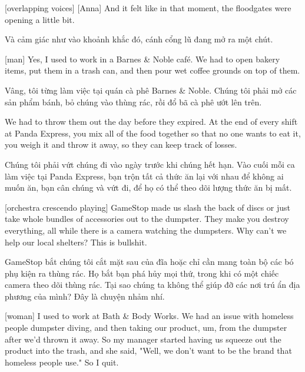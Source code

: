 \documentclass[a4paper]{article}
\begin{document}
	[overlapping voices]
	[Anna] And it felt like in that moment, the floodgates were opening a little bit.
	
	\begin{vietnamese-v2}
		 Và cảm giác như vào khoảnh khắc đó, cánh cổng lũ đang mở ra một chút.
	\end{vietnamese-v2}
	
	[man] Yes, I used to work in a Barnes \& Noble café.
	We had to open bakery items, put them in a trash can, and then pour wet coffee grounds on top of them.
	
	\begin{vietnamese-v2}
		 Vâng, tôi từng làm việc tại quán cà phê Barnes \& Noble.
		Chúng tôi phải mở các sản phẩm bánh, bỏ chúng vào thùng rác, rồi đổ bã cà phê ướt lên trên.
	\end{vietnamese-v2}
	
	We had to throw them out the day before they expired.
	At the end of every shift at Panda Express, you mix all of the food together so that no one wants to eat it, you weigh it and throw it away, so they can keep track of losses.
	
	\begin{vietnamese-v2}
		Chúng tôi phải vứt chúng đi vào ngày trước khi chúng hết hạn.
		Vào cuối mỗi ca làm việc tại Panda Express, bạn trộn tất cả thức ăn lại với nhau để không ai muốn ăn, bạn cân chúng và vứt đi, để họ có thể theo dõi lượng thức ăn bị mất.
	\end{vietnamese-v2}
	
	[orchestra crescendo playing]
	GameStop made us slash the back of discs or just take whole bundles of accessories out to the dumpster.
	They make you destroy everything, all while there is a camera watching the dumpsters.
	Why can't we help our local shelters? This is bullshit.
	
	\begin{vietnamese-v2}
		GameStop bắt chúng tôi cắt mặt sau của đĩa hoặc chỉ cần mang toàn bộ các bó phụ kiện ra thùng rác.
		Họ bắt bạn phá hủy mọi thứ, trong khi có một chiếc camera theo dõi thùng rác.
		Tại sao chúng ta không thể giúp đỡ các nơi trú ẩn địa phương của mình? Đây là chuyện nhảm nhí.
	\end{vietnamese-v2}
	
	[woman] I used to work at Bath \& Body Works.
	We had an issue with homeless people dumpster diving, and then taking our product, um, from the dumpster after we'd thrown it away.
	So my manager started having us squeeze out the product into the trash, and she said, "Well, we don't want to be the brand that homeless people use."
	So I quit.
	
\end{document}
